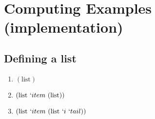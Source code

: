 \documentclass[11pt,a4paper]{report}
\newcommand{\var}[1]{`#1}
\begin{document}
\begin{comment}
\subsection{What john likes?}

A simple example of querying facts.

We start with the definitions/facts:
\begin{enumerate}

\item $(\text{mary}\ \text{likes}\ \text{wine}\ \var{p})$
\subitem mary likes wine.

\item $(\text{mary}\ \text{likes}\ \text{john}\ \var{p})$
\subitem mary likes john.

\item $(\text{peter}\ \text{likes}\ \text{peter}\ \var{p})$
\subitem peter likes himself.

\item $(\text{john}\ \text{likes}\ \var{stuff}\ (\text{mary}\ \text{likes}\ \var{stuff}\ \var{p}))$
\subitem john likes everything that mary likes.

\item $(\text{john}\ \text{likes}\ \var{person}\ (\var{person}\ \text{likes}\ \text{wine}\ \var{p}))$
\subitem john likes anyone that likes wine.

\item \[
    (\text{john}\ \text{likes}\ \var{person}\ (\text{list}\ (\var{person}\ \text{likes}\ \var{person}\ \var{p}) (\text{list}\ (\text{notEqual}\ \var{person} \text{john})\ (\text{list}))))
\]
\subitem john likes anyone that likes themselves.

\end{enumerate}

\end{comment}

\section{Computing Examples (implementation)}

\subsection{Defining a list}

\begin{enumerate}
\item $(\text{list})$
\item $(\text{list}\ \var{item}\ (\text{list}))$
\item $(\text{list}\ \var{item}\ (\text{list}\ \var{i}\ \var{tail}))$
\end{enumerate}
\end{document}
